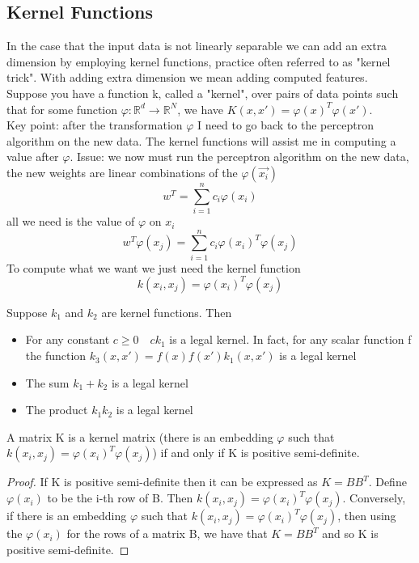 \subsection{Kernel Functions}
In the case that the input data is not linearly separable we can add an extra dimension by employing kernel functions, practice often referred to as "kernel trick". With adding extra dimension we mean adding computed features.\\
Suppose you have a function k, called a "kernel", over pairs of data points such that for some function $\varphi: \mathbb{R}^d \longrightarrow \mathbb{R}^N$, we have $K(x,x') = \varphi(x)^T\varphi(x')$.\\ Key point: after the transformation $\varphi$ I need to go back to the perceptron algorithm on the new data.  The kernel functions will assist me in computing a value after $\varphi$.  Issue: we now must run the perceptron algorithm on the new data, the new weights are linear combinations of the $\varphi(\vec{x_i})$
\[ 
    w^T = \sum_{i=1}^{n}{c_i\varphi(x_i)}
\]all we need is the value of $\varphi$ on $x_i$
\[ 
    w^T\varphi(x_j)= \sum_{i=1}^{n}{c_i\varphi(x_i)^T\varphi(x_j)}
\]
To compute what we want we just need the kernel function
\[ 
    k(x_i,x_j) = \varphi(x_i)^T\varphi (x_j)
\]
\begin{theorem}
    Suppose $k_1$ and $k_2$ are kernel functions. Then
    \begin{itemize}
        \item For any constant $c\geq 0 \quad ck_1$ is a legal kernel. In fact, for any scalar function f the function $k_3(x,x') = f(x)f(x')k_1(x,x')$ is a legal kernel
        \item The sum $k_1+k_2$ is a legal kernel
        \item The product $k_1k_2$ is a legal kernel
    \end{itemize}
\end{theorem}
\begin{lemma}
    A matrix K is a kernel matrix (there is an embedding $\varphi$ such that $k(x_i,x_j) = \varphi(x_i)^T\varphi (x_j)$) if and only if K is positive semi-definite.
    \begin{proof}
        If K is positive semi-definite then it can be expressed as $K = BB^T$. Define $\varphi(x_i)$ to be the i-th row of B. Then $k(x_i,x_j) = \varphi(x_i)^T\varphi (x_j)$. Conversely, if there is an embedding $\varphi$ such that $k(x_i,x_j) = \varphi(x_i)^T\varphi (x_j)$, then using the $\varphi(x_i)$ for the rows of a matrix B, we have that $K=BB^T$ and so K is positive semi-definite.
    \end{proof} 
\end{lemma} 

